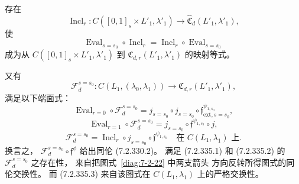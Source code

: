 存在
\[
\operatorname{Incl}_r\colon
C([0,1]_s\times L'_1,\lambda'_1)
\longrightarrow\widehat{\mathfrak C}_d(L'_1,\lambda'_1),
\]
使
\begin{equation}
\operatorname{Eval}_{s=s_0}\circ\operatorname{Incl}_r
=\operatorname{Incl}_r\circ\operatorname{Eval}_{s=s_0}
\tag{7.2.334}\label{eq:7-2-334}
\end{equation}
成为从
$C([0,1]_s\times L'_1,\lambda'_1)$
到 $\mathfrak C_{d,r}(L'_1,\lambda'_1)$
的映射等式。

又有
\[
\mathcal F_d^{s=s_0}\colon
C(L_1,(\lambda_0,\lambda_1))
\longrightarrow
\mathfrak C_{d,r}(L'_1,\lambda'_1),
\]
满足以下端面式：
\begin{equation}
\operatorname{Eval}_{r=0}\circ\mathcal F_d^{s=s_0}
=j_{s=s_0}\circ j_{s=s_0}\circ
\mathfrak f_{\mathrm{ext},s=s_0}^{\psi_{1,s_0}},
\tag{7.2.335.1}\label{eq:7-2-335-1}
\end{equation}
\begin{equation}
\operatorname{Eval}_{r=1}\circ\mathcal F_d^{s=s_0}
=j_{s=s_0}\circ\mathfrak f^{\psi_{1,s_0}}\circ j,
\tag{7.2.335.2}\label{eq:7-2-335-2}
\end{equation}
\begin{equation}
\mathcal F_d^{s=s_0}
=\operatorname{Incl}_r\circ j_{s=s_0}
\circ\mathfrak f^{\psi_{1,s_0}}
\quad\text{在 }C(L_1,\lambda_1)\text{ 上}.
\tag{7.2.335.3}\label{eq:7-2-335-3}
\end{equation}
换言之，
$\mathcal F_d^{s=s_0}\circ\mathfrak f^\phi$
给出同伦 (7.2.330.2)。
满足 (7.2.335.1) 和 (7.2.335.2)
的 $\mathcal F_d^{s=s_0}$ 之存在性，
来自把图式~\ref{diag:7-2-22} 中两支箭头
方向反转所得图式的同伦交换性。
而 (7.2.335.3)
来自该图式在 $C(L_1,\lambda_1)$
上的严格交换性。
